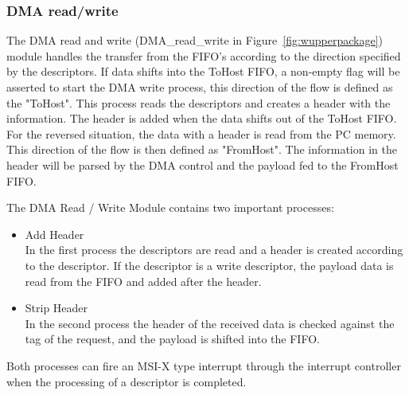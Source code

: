 \subsubsection {DMA read/write}
The DMA read and write (DMA\_read\_write in Figure~\ref{fig:wupperpackage}) module handles the transfer from the FIFO's according to the direction specified by the descriptors. If data shifts into the ToHost FIFO, a non-empty flag will be asserted to start the DMA write process, this direction of the flow is defined as the "ToHost". This process reads the descriptors and creates a header with the information. The header is added when the data shifts out of the ToHost FIFO. For the reversed situation, the data with a header is read from the PC memory. This direction of the flow is then defined as "FromHost". The information in the header will be parsed by the DMA control and the payload fed to the FromHost FIFO.

The DMA Read / Write Module contains two important processes:
\begin{itemize}
	\item Add Header\\In the first process the descriptors are read and a header is created according to the descriptor. If the descriptor is a write descriptor, the payload data is read from the FIFO and added after the header.
	\item Strip Header\\In the second process the header of the received data is checked against the tag of the request, and the payload is shifted into the FIFO.
\end{itemize}
Both processes can fire an MSI-X type interrupt through the interrupt controller when the processing of a descriptor is completed.

